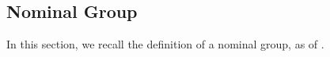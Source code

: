 \documentclass{article}
\begin{document}


    \subsection{Nominal Group}

    In this section, we recall the definition of a nominal group, as of \cite{EC:ABHKLR21}.
\end{document}

